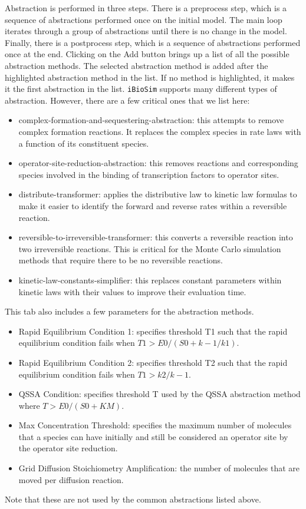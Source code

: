 \documentclass[titlepage,11pt]{article}
\begin{document}
\noindent
Abstraction is performed in three steps.  There is a preprocess step, which is a sequence of abstractions performed once on the initial model.  The main loop iterates through a group of abstractions until there is no change in the model.  Finally, there is a postprocess step, which is a sequence of abstractions performed once at the end.  Clicking on the Add button brings up a list of all the possible abstraction methods.  The selected abstraction method is added after the highlighted abstraction method in the list.  If no method is highlighted, it makes it the first abstraction in the list.
{\tt iBioSim} supports many different types of abstraction.  However, there are a few critical ones that we list here:
\begin{itemize}
\item complex-formation-and-sequestering-abstraction: this attempts to remove complex formation reactions.  It replaces the complex species in rate laws with a function of its constituent species.
\item operator-site-reduction-abstraction: this removes reactions and corresponding species involved in the binding of transcription factors to operator sites.
\item distribute-transformer: applies the distributive law to kinetic law formulas to make it easier to identify the forward and reverse rates within a reversible reaction.
\item reversible-to-irreversible-transformer: this converts a reversible reaction into two irreversible reactions.  This is critical for the Monte Carlo simulation methods that require there to be no reversible reactions.
\item kinetic-law-constants-simplifier: this replaces constant parameters within kinetic laws with their values to improve their evaluation time.
\end{itemize}
This tab also includes a few parameters for the abstraction methods.
\begin{itemize}
\item Rapid Equilibrium Condition 1: specifies threshold T1 such that the rapid equilibrium condition fails when $T1 > E0 / (S0 + k-1/k1)$.
\item Rapid Equilibrium Condition 2: specifies threshold T2 such that the rapid equilibrium condition fails when $T1 > k2 /k-1$.
\item QSSA Condition: specifies threshold T used by the QSSA abstraction method where $T > E0 / (S0 + KM)$.
\item Max Concentration Threshold: specifies the maximum number of molecules that a species can have initially and still be considered an operator site by the operator site reduction. 
\item Grid Diffusion Stoichiometry Amplification: the number of molecules that are moved per diffusion reaction. 
\end{itemize}
Note that these are not used by the common abstractions listed above.
\end{document}
